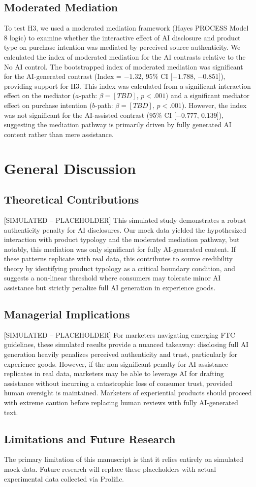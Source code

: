 \documentclass[12pt, letterpaper]{article}
\begin{document}
\subsection{Moderated Mediation}
To test H3, we used a moderated mediation framework (Hayes PROCESS Model 8 logic) to examine whether the interactive effect of AI disclosure and product type on purchase intention was mediated by perceived source authenticity. We calculated the index of moderated mediation for the AI contrasts relative to the No AI control. The bootstrapped index of moderated mediation was significant for the AI-generated contrast (Index = $-1.32$, $95\%$ CI [$-1.788$, $-0.851$]), providing support for H3. This index was calculated from a significant interaction effect on the mediator ($a$-path: $\beta = [TBD]$, $p < .001$) and a significant mediator effect on purchase intention ($b$-path: $\beta = [TBD]$, $p < .001$). However, the index was not significant for the AI-assisted contrast ($95\%$ CI [$-0.777$, $0.139$]), suggesting the mediation pathway is primarily driven by fully generated AI content rather than mere assistance.

\section{General Discussion}
\subsection{Theoretical Contributions}
[SIMULATED -- PLACEHOLDER] This simulated study demonstrates a robust authenticity penalty for AI disclosures. Our mock data yielded the hypothesized interaction with product typology and the moderated mediation pathway, but notably, this mediation was only significant for fully AI-generated content. If these patterns replicate with real data, this contributes to source credibility theory by identifying product typology as a critical boundary condition, and suggests a non-linear threshold where consumers may tolerate minor AI assistance but strictly penalize full AI generation in experience goods.
\subsection{Managerial Implications}
[SIMULATED -- PLACEHOLDER] For marketers navigating emerging FTC guidelines, these simulated results provide a nuanced takeaway: disclosing full AI generation heavily penalizes perceived authenticity and trust, particularly for experience goods. However, if the non-significant penalty for AI assistance replicates in real data, marketers may be able to leverage AI for drafting assistance without incurring a catastrophic loss of consumer trust, provided human oversight is maintained. Marketers of experiential products should proceed with extreme caution before replacing human reviews with fully AI-generated text.
\subsection{Limitations and Future Research}
The primary limitation of this manuscript is that it relies entirely on simulated mock data. Future research will replace these placeholders with actual experimental data collected via Prolific.



\end{document}
